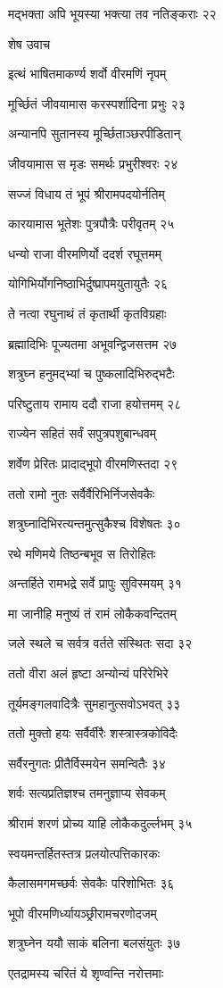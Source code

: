 मद्भक्ता अपि भूयस्या भक्त्या तव नतिङ्कराः २२

शेष उवाच

इत्थं भाषितमाकर्ण्य शर्वो वीरमणिं नृपम्

मूर्च्छितं जीवयामास करस्पर्शादिना प्रभुः २३

अन्यानपि सुतानस्य मूर्च्छिताञ्छरपीडितान्

जीवयामास स मृडः समर्थः प्रभुरीश्वरः २४

सज्जं विधाय तं भूपं श्रीरामपदयोर्नतिम्

कारयामास भूतेशः पुत्रपौत्रैः परीवृतम् २५

धन्यो राजा वीरमणिर्यो ददर्श रघूत्तमम्

योगिभिर्योगनिष्ठाभिर्दुष्प्रापमयुतायुतैः २६

ते नत्वा रघुनाथं तं कृतार्थी कृतविग्रहाः

ब्रह्मादिभिः पूज्यतमा अभूवन्द्विजसत्तम २७

शत्रुघ्न हनुमद्भ्यां च पुष्कलादिभिरुद्भटैः

परिष्टुताय रामाय ददौ राजा हयोत्तमम् २८

राज्येन सहितं सर्वं सपुत्रपशुबान्धवम्

शर्वेण प्रेरितः प्रादाद्भूपो वीरमणिस्तदा २९

ततो रामो नुतः सर्वैर्वैरिभिर्निजसेवकैः

शत्रुघ्नादिभिरत्यन्तमुत्सुकैश्च विशेषतः ३०

रथे मणिमये तिष्ठन्बभूव स तिरोहितः

अन्तर्हिते रामभद्रे सर्वे प्रापुः सुविस्मयम् ३१

मा जानीहि मनुष्यं तं रामं लोकैकवन्दितम्

जले स्थले च सर्वत्र वर्तते संस्थितः सदा ३२

ततो वीरा अलं हृष्टा अन्योन्यं परिरेभिरे

तूर्यमङ्गलवादित्रैः सुमहानुत्सवोऽभवत् ३३

ततो मुक्तो हयः सर्वैर्वीरैः शस्त्रास्त्रकोविदैः

सर्वैरनुगतः प्रीतैर्विस्मयेन समन्वितैः ३४

शर्वः सत्यप्रतिज्ञश्च तमनुज्ञाप्य सेवकम्

श्रीरामं शरणं प्रोच्य याहि लोकैकदुर्ल्लभम् ३५

स्वयमन्तर्हितस्तत्र प्रलयोत्पत्तिकारकः

कैलासमगमच्छर्वः सेवकैः परिशोभितः ३६

भूपो वीरमणिर्ध्यायञ्छ्रीरामचरणोदजम्

शत्रुघ्नेन ययौ साकं बलिना बलसंयुतः ३७

एतद्रामस्य चरितं ये शृण्वन्ति नरोत्तमाः

